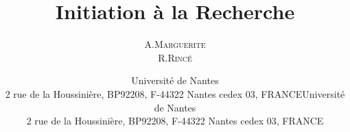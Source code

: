 \documentclass[11pt,a4paper,utf8x]{report}
\title{ \huge{Initiation à la Recherche \vspace{3cm} }%
}
\author{A.\textsc{Marguerite}\\ R.\textsc{Rincé}}%
\date{Université de Nantes \\ 2 rue de la Houssinière, BP92208, F-44322 Nantes cedex 03, FRANCE}
\date{Université de Nantes \\ 2 rue de la Houssinière, BP92208, F-44322 Nantes cedex 03, FRANCE}
\begin{document}
\maketitle
\renewcommand{\labelitemi}{$\bullet$} 

\clearpage

\tableofcontents
\clearpage










\listoffigures


\end{document}
